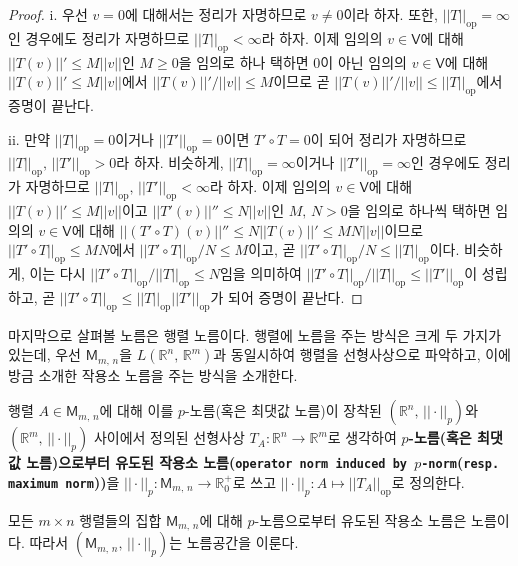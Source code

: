 \begin{proof}
    i. 우선 $v=0$에 대해서는 정리가 자명하므로 $v\ne0$이라 하자. 또한, $||T||_\mathrm{op}=\infty$인 경우에도 정리가 자명하므로 $||T||_\mathrm{op}<\infty$라 하자. 이제 임의의 $v\in\mathsf{V}$에 대해 $||T(v)||'\leq M||v||$인 $M\geq0$을 임의로 하나 택하면 $0$이 아닌 임의의 $v\in\mathsf{V}$에 대해 $||T(v)||'\leq M||v||$에서 $||T(v)||'/||v||\leq M$이므로 곧 $||T(v)||'/||v||\leq||T||_\mathrm{op}$에서 증명이 끝난다.

    ii. 만약 $||T||_\mathrm{op}=0$이거나 $||T'||_\mathrm{op}=0$이면 $T'\circ T=0$이 되어 정리가 자명하므로 $||T||_\mathrm{op},\,||T'||_\mathrm{op}>0$라 하자. 비슷하게, $||T||_\mathrm{op}=\infty$이거나 $||T'||_\mathrm{op}=\infty$인 경우에도 정리가 자명하므로 $||T||_\mathrm{op},\,||T'||_\mathrm{op}<\infty$라 하자. 이제 임의의 $v\in\mathsf{V}$에 대해 $||T(v)||'\leq M||v||$이고 $||T'(v)||''\leq N||v||$인 $M,\,N>0$을 임의로 하나씩 택하면 임의의 $v\in\mathsf{V}$에 대해 $||(T'\circ T)(v)||''\leq N||T(v)||'\leq MN||v||$이므로 $||T'\circ T||_\mathrm{op}\leq MN$에서 $||T'\circ T||_\mathrm{op}/N\leq M$이고, 곧 $||T'\circ T||_\mathrm{op}/N\leq||T||_\mathrm{op}$이다. 비슷하게, 이는 다시 $||T'\circ T||_\mathrm{op}/||T||_\mathrm{op}\leq N$임을 의미하여 $||T'\circ T||_\mathrm{op}/||T||_\mathrm{op}\leq||T'||_\mathrm{op}$이 성립하고, 곧 $||T'\circ T||_\mathrm{op}\leq||T||_\mathrm{op}||T'||_\mathrm{op}$가 되어 증명이 끝난다.
\end{proof}

마지막으로 살펴볼 노름은 행렬 노름이다. 행렬에 노름을 주는 방식은 크게 두 가지가 있는데, 우선 $\mathsf{M}_{m,\,n}$을 $L(\mathbb{R}^n,\,\mathbb{R}^m)$과 동일시하여 행렬을 선형사상으로 파악하고, 이에 방금 소개한 작용소 노름을 주는 방식을 소개한다.

\begin{definition}
    행렬 $A\in\mathsf{M}_{m,\,n}$에 대해 이를 $p$-노름(혹은 최댓값 노름)이 장착된 $(\mathbb{R}^n,\,||\cdot||_p)$와 $(\mathbb{R}^m,\,||\cdot||_p)$ 사이에서 정의된 선형사상 $T_A:\mathbb{R}^n\to\mathbb{R}^m$로 생각하여 \textbf{$p$-노름(혹은 최댓값 노름)으로부터 유도된 작용소 노름(\texttt{operator norm induced by $p$-norm}(\texttt{resp. maximum norm}))}을 $||\cdot||_p:\mathsf{M}_{m,\,n}\to\mathbb{R}_0^+$로 쓰고 $||\cdot||_p:A\mapsto||T_A||_\mathrm{op}$로 정의한다.
\end{definition}

\begin{proposition}
    모든 $m\times n$ 행렬들의 집합 $\mathsf{M}_{m,\,n}$에 대해 $p$-노름으로부터 유도된 작용소 노름은 노름이다. 따라서 $(\mathsf{M}_{m,\,n},\,||\cdot||_p)$는 노름공간을 이룬다.
\end{proposition}


